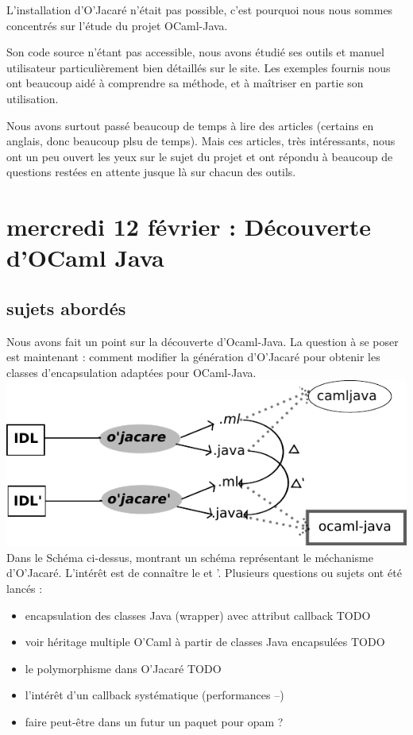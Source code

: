 \documentclass[a4paper, 11pt]{report}
\begin{document}
L'installation d'O'Jacaré n'était pas possible, c'est pourquoi nous
nous sommes concentrés sur l'étude du projet OCaml-Java. 

Son code source n'étant pas accessible, nous avons étudié ses outils
et manuel utilisateur particulièrement bien détaillés sur le site. Les
exemples fournis nous ont beaucoup aidé à comprendre sa méthode, et à
maîtriser en partie son utilisation.

Nous avons surtout passé beaucoup de temps à lire des articles
(certains en anglais, donc beaucoup plsu de temps).
Mais ces articles, très intéressants, nous ont un peu ouvert les yeux sur
le sujet du projet et ont répondu à beaucoup de questions restées en
attente jusque là sur chacun des outils. 

\section{mercredi 12 février : Découverte d'OCaml Java}
\subsection{sujets abordés}
Nous avons fait un point sur la découverte d'Ocaml-Java. La question à
se poser est maintenant : comment modifier la génération d'O'Jacaré
pour obtenir les classes d'encapsulation adaptées pour OCaml-Java.
\includegraphics{schema1.pdf}
Dans le Schéma ci-dessus, montrant un schéma représentant le
méchanisme d'O'Jacaré.
L'intérêt est de connaître le \delta et
\delta'.
Plusieurs questions ou sujets ont été lancés :
\begin{itemize}
\item encapsulation des classes Java (wrapper) avec attribut callback
  TODO
\item voir héritage multiple O'Caml à partir de classes Java
  encapsulées TODO
\item le polymorphisme dans O'Jacaré TODO
\item l'intérêt d'un callback systématique (performances --)
\item faire peut-être dans un futur un paquet pour opam ?
\end{itemize}
\end{document}
